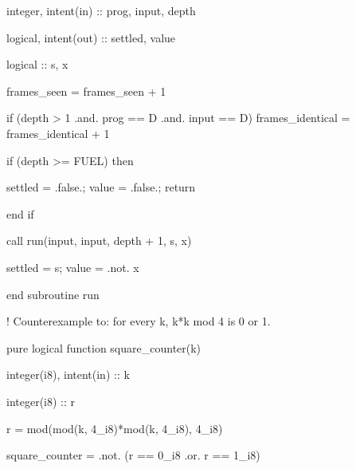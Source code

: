 \documentclass[10pt,twocolumn]{article}
\newenvironment{Shaded}{}{}
\newcommand{\BuiltInTok}[1]{#1}
\newcommand{\CommentTok}[1]{#1}
\newcommand{\ConstantTok}[1]{#1}
\newcommand{\DataTypeTok}[1]{#1}
\newcommand{\DecValTok}[1]{#1}
\newcommand{\KeywordTok}[1]{#1}
\newcommand{\NormalTok}[1]{#1}
\newcommand{\OperatorTok}[1]{#1}
\providecommand{\BuiltInTok}[1]{#1}
\providecommand{\CommentTok}[1]{#1}
\providecommand{\ConstantTok}[1]{#1}
\providecommand{\DataTypeTok}[1]{#1}
\providecommand{\DecValTok}[1]{#1}
\providecommand{\KeywordTok}[1]{#1}
\providecommand{\NormalTok}[1]{#1}
\providecommand{\OperatorTok}[1]{#1}
\providecommand{\BuiltInTok}[1]{#1}
\providecommand{\CommentTok}[1]{#1}
\providecommand{\ConstantTok}[1]{#1}
\providecommand{\DataTypeTok}[1]{#1}
\providecommand{\DecValTok}[1]{#1}
\providecommand{\KeywordTok}[1]{#1}
\providecommand{\NormalTok}[1]{#1}
\providecommand{\OperatorTok}[1]{#1}
\begin{document}
\begin{strip}
\begin{Shaded}
\begin{Highlighting}[]
    \DataTypeTok{integer}\NormalTok{, }\DataTypeTok{intent(in)}  \DataTypeTok{::}\NormalTok{ prog, input, depth}

    \DataTypeTok{logical}\NormalTok{, }\DataTypeTok{intent(out)} \DataTypeTok{::}\NormalTok{ settled, value}

    \DataTypeTok{logical} \DataTypeTok{::}\NormalTok{ s, x}

\NormalTok{    frames\_seen }\KeywordTok{=}\NormalTok{ frames\_seen }\KeywordTok{+} \DecValTok{1}

    \KeywordTok{if}\NormalTok{ (depth }\OperatorTok{\textgreater{}} \DecValTok{1} \OperatorTok{.and.}\NormalTok{ prog }\OperatorTok{==}\NormalTok{ D }\OperatorTok{.and.}\NormalTok{ input }\OperatorTok{==}\NormalTok{ D) frames\_identical }\KeywordTok{=}\NormalTok{ frames\_identical }\KeywordTok{+} \DecValTok{1}

    \KeywordTok{if}\NormalTok{ (depth }\OperatorTok{\textgreater{}=}\NormalTok{ FUEL) }\KeywordTok{then}

\NormalTok{       settled }\KeywordTok{=} \ConstantTok{.false.}\NormalTok{;  value }\KeywordTok{=} \ConstantTok{.false.}\NormalTok{;  }\KeywordTok{return}

    \KeywordTok{end if}

    \KeywordTok{call}\NormalTok{ run(input, input, depth }\KeywordTok{+} \DecValTok{1}\NormalTok{, s, x)}

\NormalTok{    settled }\KeywordTok{=}\NormalTok{ s;  value }\KeywordTok{=} \OperatorTok{.not.}\NormalTok{ x}

  \KeywordTok{end subroutine}\NormalTok{ run}

  \CommentTok{! Counterexample to: for every k, k*k mod 4 is 0 or 1.}

  \KeywordTok{pure} \DataTypeTok{logical} \KeywordTok{function}\NormalTok{ square\_counter(k)}

    \DataTypeTok{integer(i8)}\NormalTok{, }\DataTypeTok{intent(in)} \DataTypeTok{::}\NormalTok{ k}

    \DataTypeTok{integer(i8)} \DataTypeTok{::}\NormalTok{ r}

\NormalTok{    r }\KeywordTok{=} \BuiltInTok{mod}\NormalTok{(}\BuiltInTok{mod}\NormalTok{(k, }\DecValTok{4\_i8}\NormalTok{)}\KeywordTok{*}\BuiltInTok{mod}\NormalTok{(k, }\DecValTok{4\_i8}\NormalTok{), }\DecValTok{4\_i8}\NormalTok{)}

\NormalTok{    square\_counter }\KeywordTok{=} \OperatorTok{.not.}\NormalTok{ (r }\OperatorTok{==} \DecValTok{0\_i8} \OperatorTok{.or.}\NormalTok{ r }\OperatorTok{==} \DecValTok{1\_i8}\NormalTok{)}


\end{Highlighting}
\end{Shaded}
\end{strip}
\end{document}

